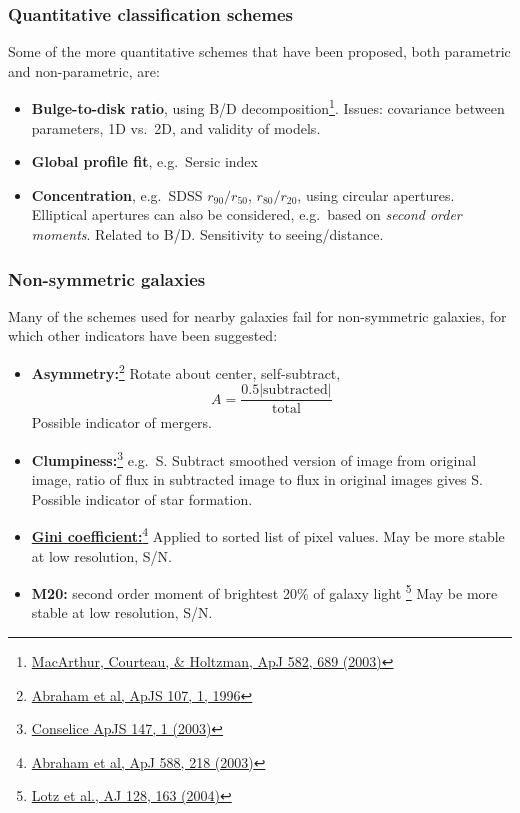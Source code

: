 \documentclass{article}
\begin{document}
\subsubsection{Quantitative classification schemes}\label{sssec:quantitative}
Some of the more quantitative schemes that have been
proposed, both parametric and non-parametric, are:
\begin{itemize}
    \item \textbf{Bulge-to-disk ratio}, using B/D decomposition\footnote{
        \href{http://adsabs.harvard.edu/cgi-bin/nph-bib_query?bibcode=2003ApJ...582..689}
        {MacArthur, Courteau, \& Holtzman, ApJ 582, 689 (2003)}}.
        Issues: covariance between parameters, 1D vs.\ 2D, and validity of models.
    \item \textbf{Global profile fit}, e.g.\ Sersic index
    \item \textbf{Concentration}, e.g.\ SDSS $r_{90}/r_{50}$, $r_{80}/r_{20}$,
        using circular apertures. Elliptical apertures can also be considered,
        e.g.\ based on \emph{second order moments}.
        Related to B/D. Sensitivity to seeing/distance.
\end{itemize}

\subsubsection{Non-symmetric galaxies}
Many of the schemes used for nearby galaxies fail for non-symmetric galaxies,
for which other indicators have been suggested:
\begin{itemize}
    \item \textbf{Asymmetry:}\footnote{\href{http://adsabs.harvard.edu/cgi-bin/nph-bib_query?bibcode=1996ApJS..107....1A}
        {Abraham et al, ApJS 107, 1, 1996}}
        Rotate about center, self-subtract,
        \[
            A = \frac{0.5\vert\mathrm{subtracted}\vert}{\mathrm{total}}
            \]
        Possible indicator of mergers.
    \item \textbf{Clumpiness:}\footnote{\href{http://adsabs.harvard.edu/cgi-bin/bib_query?2003ApJS..147....1}
        {Conselice ApJS 147, 1 (2003)}} e.g.\ S. Subtract smoothed version of
        image from original image, ratio of flux in subtracted image to flux in
        original images gives S. Possible indicator of star formation.
    \item \textbf{\href{http://astronomy.nmsu.edu/holtz/a555/images/gini.htm}
        {Gini coefficient:}}\footnote{\href{http://adsabs.harvard.edu/cgi-bin/nph-bib_query?bibcode=2003ApJ...588..218A}
        {Abraham et al, ApJ 588, 218 (2003)}}
        Applied to sorted list of pixel values. May be more stable at low
        resolution, S/N.
    \item \textbf{M20:} second order moment of brightest 20\% of
        galaxy light
        \footnote{\href{http://adsabs.harvard.edu/cgi-bin/nph-bib_query?bibcode=2004AJ....128..163L}
        {Lotz et al., AJ 128, 163 (2004)}}
        May be more stable at low resolution, S/N.
\end{itemize}
\end{document}
